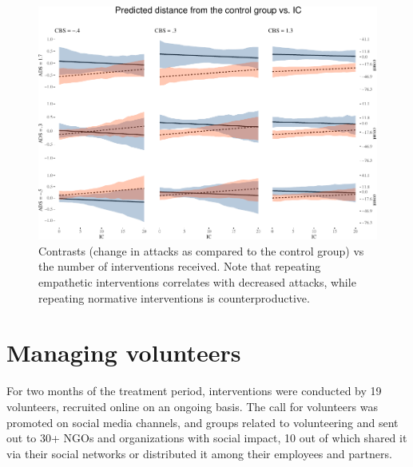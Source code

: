 \documentclass[preprint,12pt]{elsarticle}
\begin{document}
\begin{figure}

\begin{center}\includegraphics[width=1\linewidth]{ figures/visICPlot-1} \end{center}
\caption{Contrasts (change in attacks as compared to the control group) vs the number
of interventions received. Note that repeating empathetic interventions
correlates with decreased attacks, while repeating normative interventions
is counterproductive.}
\label{fig:ContrastsIC}
\end{figure}












\section{Managing volunteers}\label{volunteers}

For two months of the treatment period, interventions were conducted by 19 volunteers, recruited  online on an ongoing basis. The call for volunteers was promoted on social media channels, and groups related to volunteering and sent out to 30+ NGOs and organizations with social impact, 10 out of which shared it via their social networks or distributed it among their employees and partners. 
\end{document}
